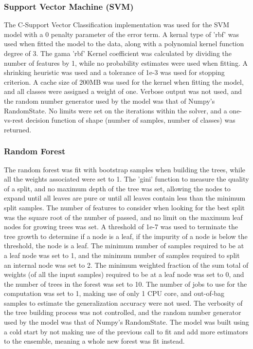 \subsubsection{Support Vector Machine (SVM)}
The C-Support Vector Classification implementation was used for the SVM model with a 0 penalty parameter of the error term. A kernal type of 'rbf' was used when fitted the model to the data, along with a polynomial kernel function degree of 3. The gama 'rbf' Kernel coefficient was calculated by dividing the number of features by 1, while no probability estimates were used when fitting. A shrinking heuristic was used and a tolerance of 1e-3 was used for stopping criterion. A cache size of 200MB was used for the kernel when fitting the model, and all classes were assigned a weight of one. Verbose output was not used, and the random number generator used by the model was that of Numpy's RandomState. No limits were set on the iterations within the solver, and a  one-vs-rest decision function of shape (number of samples, number of classes) was returned.

\subsubsection{Random Forest}
The random forest was fit with bootstrap samples when building the trees, while all the weights associated were set to 1. The 'gini' function to measure the quality of a split, and no maximum depth of the tree was set, allowing the nodes to expand until all leaves are pure or until all leaves contain less than the minimum split samples. The number of features to consider when looking for the best split was the square root of the number of passed, and no limit on the maximum leaf nodes for growing trees was set. A threshold of 1e-7 was used to terminate the tree growth to determine if a node is a leaf, if the impurity of a node is below the threshold, the node is a leaf. The minimum number of samples required to be at a leaf node was set to 1, and the minimum number of samples required to split an internal node was set to 2. The minimum weighted fraction of the sum total of weights (of all the input samples) required to be at a leaf node was set to 0, and the number of trees in the forest was set to 10. The number of jobs to use for the computation was set to 1, making use of only 1 CPU core, and out-of-bag samples to estimate the generalization accuracy were not used. The verbosity of the tree building process was not controlled, and the random number generator used by the model was that of Numpy's RandomState. The model was built using a cold start by not making use of the previous call to fit and add more estimators to the ensemble, meaning a whole new forest was fit instead.

